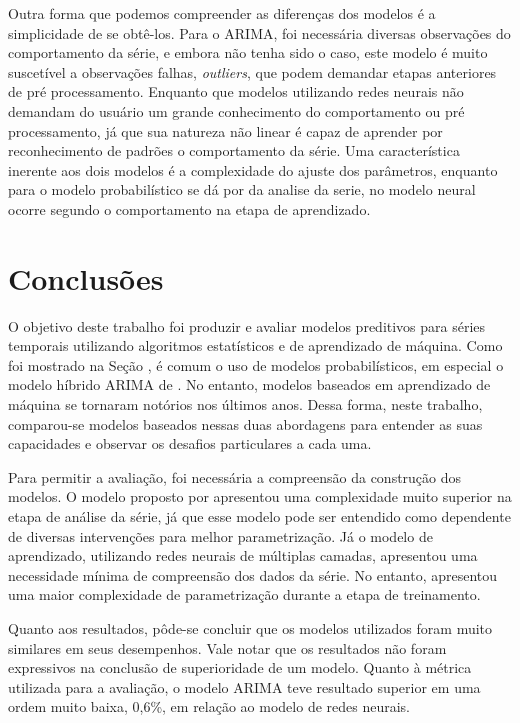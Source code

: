 \documentclass[
    12pt,
    oneside,
    a4paper,
    english,
    brazil
]{abntex2}
\begin{document}
Outra forma que podemos compreender as  diferenças dos modelos é a simplicidade
de  se  obtê-los.  Para  o   ARIMA,  foi  necessária  diversas  observações  do
comportamento da  série, e embora  não tenha sido o  caso, este modelo  é muito
suscetível a  observações falhas, \textit{outliers}, que  podem demandar etapas
anteriores de pré processamento. Enquanto  que modelos utilizando redes neurais
não  demandam  do  usuário  um  grande conhecimento  do  comportamento  ou  pré
processamento,  já  que  sua  natureza  não linear  é  capaz  de  aprender  por
reconhecimento de padrões o comportamento da série. Uma característica inerente
aos dois  modelos é a  complexidade do ajuste  dos parâmetros, enquanto  para o
modelo probabilístico  se dá por da  analise da serie, no  modelo neural ocorre
segundo o comportamento na etapa de aprendizado.

\chapter{Conclusões}\label{chap:concl}

O objetivo deste trabalho foi produzir e avaliar modelos preditivos para séries
temporais utilizando algoritmos estatísticos e  de aprendizado de máquina. Como
foi mostrado na Seção \label{chap:trab_relacionados},  é comum o uso de modelos
probabilísticos, em  especial o  modelo híbrido  ARIMA de  . No
entanto, modelos  baseados em aprendizado  de máquina se tornaram  notórios nos
últimos anos. Dessa forma, neste  trabalho, comparou-se modelos baseados nessas
duas  abordagens para  entender  as  suas capacidades  e  observar os  desafios
particulares a cada uma.

Para  permitir a  avaliação, foi  necessária  a compreensão  da construção  dos
modelos.  O modelo  proposto por   apresentou  uma complexidade
muito  superior na  etapa de  análise da  série, já  que esse  modelo pode  ser
entendido como dependente de  diversas intervenções para melhor parametrização.
Já  o modelo  de aprendizado,  utilizando redes  neurais de  múltiplas camadas,
apresentou  uma  necessidade mínima  de  compreensão  dos  dados da  série.  No
entanto, apresentou uma maior complexidade de parametrização durante a etapa de
treinamento.

Quanto aos resultados,  pôde-se concluir que os modelos  utilizados foram muito
similares  em  seus  desempenhos.  Vale  notar  que  os  resultados  não  foram
expressivos  na conclusão  de  superioridade  de um  modelo.  Quanto à  métrica
utilizada para a avaliação, o modelo ARIMA teve resultado superior em uma ordem
muito baixa, 0,6\%, em relação ao modelo de redes neurais.
\end{document}

